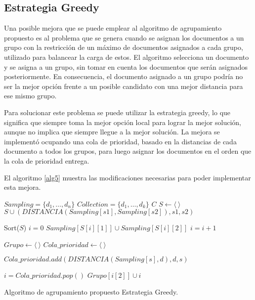 \subsection{Estrategia Greedy}

Una posible mejora que se puede emplear al algoritmo de agrupamiento propuesto es al problema que se genera cuando se asignan los documentos a un grupo con la restricción de un máximo de documentos asignados a cada grupo, utilizado para balancear la carga de estos. El algoritmo selecciona un documento y se asigna a un grupo, sin tomar en cuenta los documentos que serán asignados posteriormente. En consecuencia, el documento asignado a un grupo podría no ser la mejor opción frente a un posible candidato con una mejor distancia para ese mismo grupo.

Para solucionar este problema se puede utilizar la estrategia greedy, lo que significa que siempre toma la mejor opción local para lograr la mejor solución, aunque no implica que siempre llegue a la mejor solución. La mejora se implementó ocupando una cola de prioridad, basado en la distancias de cada documento a todos los grupos, para luego asignar los documentos en el orden que la cola de prioridad entrega.

El algoritmo \ref{alg5} muestra las modificaciones necesarias para poder implementar esta mejora.


\begin{algorithm}[ht!]
\begin{algorithmic}[1]
\REQUIRE $Sampling=\{d_{1}, \dots, d_{n} \}$
\REQUIRE $Collection=\{d_{1}, \dots, d_{k} \}$ 
\REQUIRE $C$ 
\STATE $S \leftarrow \langle\ \rangle$
			\STATE $S \cup  (DISTANCIA(Sampling[s1],Sampling[s2]) , s1 ,s2)$
		\ENDFOR
\ENDFOR

\STATE Sort($S$)
\STATE $i = 0$
	\STATE $ Sampling[S[i][1]] \cup Sampling[S[i][2]]$
	\STATE $i = i +1$
\ENDWHILE



\STATE $Grupo \leftarrow \langle\ \rangle$  
\STATE $Cola\_prioridad \leftarrow \langle\ \rangle$ 

	\STATE $Cola\_prioridad.add(DISTANCIA(Sampling[s],d),d,s)$	
\ENDFOR
\ENDFOR

	\STATE $i = Cola\_prioridad.pop()$
	\STATE $Grupo[i[2]] \cup i$
\ENDWHILE

\end{algorithmic}
\caption{Algoritmo de agrupamiento propuesto Estrategia Greedy. }\label{alg5} 
\end{algorithm}

